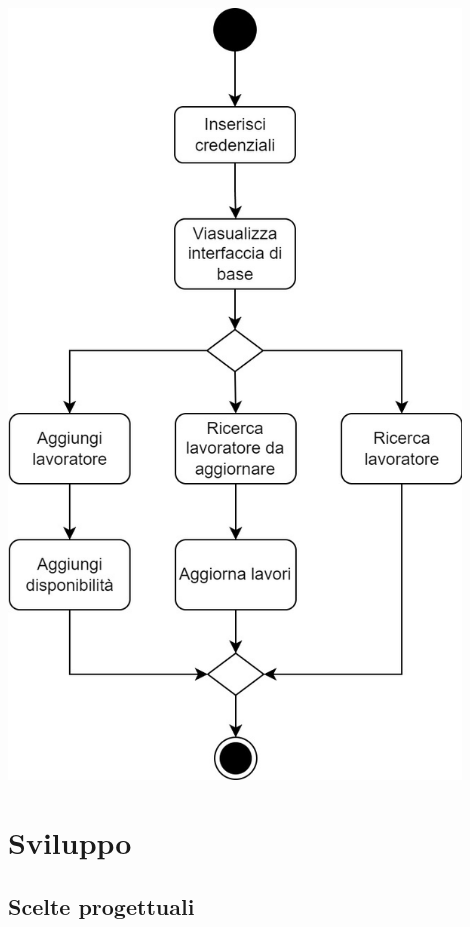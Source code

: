 \documentclass{article}
\begin{document}
    \includegraphics[width=0.9\textwidth]{diagramma_attivitÃ .jpg}

    \section{Sviluppo}

    \subsection{Scelte progettuali}
\end{document}
